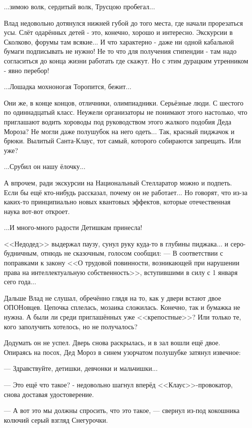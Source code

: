 ...зимою волк, сердитый волк,
Трусцою пробегал... 

Влад недовольно дотянулся нижней губой до того места, где начали прорезаться усы. Слёт одарённых детей - это, конечно, хорошо и интересно. Экскурсии в Сколково, форумы там всякие... И что характерно - даже ни одной кабальной бумаги подписывать не нужно! Не то что для получения стипендии - там надо согласиться до конца жизни работать где скажут. Но с этим дурацким утренником - явно перебор!

...Лошадка мохноногая
Торопится, бежит...

Они же, в конце концов, отличники, олимпиадники. Серьёзные люди. С шестого по одиннадцатый класс. Неужели организаторы не понимают этого настолько, что приглашают водить хороводы под руководством этого жалкого подобия Деда Мороза? Не могли даже полушубок на него одеть... Так, красный пиджачок и брюки. Вылитый Санта-Клаус, тот самый, которого собираются запрещать. Или уже?

...Срубил он нашу ёлочку...

А впрочем, ради экскурсии на Национальный Стелларатор можно и подпеть. Если бы ещё кто-нибудь рассказал, почему он не работает... Но говорят, что из-за каких-то принципиально новых квантовых эффектов, которые отечественная наука вот-вот откроет.

...И много-много радости
Детишкам принесла!

<<Недодед>> выдержал паузу, сунул руку куда-то в глубины пиджака... и серо-будничным, отнюдь не сказочным, голосом сообщил:
--- В соответствии с поправками к закону
<<О трудовой повинности, возникающей при нарушении права на интеллектуальную собственность>>,
вступившими в силу с 1 января сего года...

Дальше Влад не слушал, обречённо глядя на то, как у двери встают двое ОПОНовцев.
Цепочка сплелась, мозаика сложилась. Конечно, так и бумажка не нужна. А были ли среди приглашённых уже <<крепостные>>?
Или только те, кого заполучить хотелось, но не получалось?

Додумать он не успел. Дверь снова раскрылась, и в зал вошли ещё двое.
Опираясь на посох, Дед Мороз в синем узорчатом полушубке затянул извечное:

--- Здравствуйте, детишки, девчонки и мальчишки...

--- Это ещё что такое? - недовольно шагнул вперёд <<Клаус>>-провокатор, снова доставая удостоверение.

--- А вот это мы должны спросить, что это такое, --- свернул из-под кокошника колючий серый взгляд Снегурочки.

